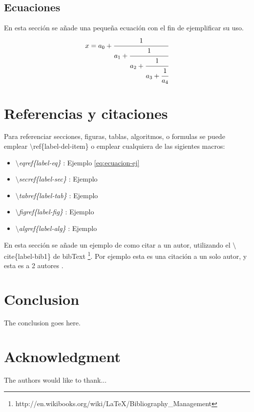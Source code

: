 \subsection{Ecuaciones}
En esta sección se añade una pequeña ecuación con el fin de ejemplificar su
uso.
\begin{equation}\label{eq:ecuacion-ej}
  x = a_0 + \cfrac{1}{a_1
          + \cfrac{1}{a_2
          + \cfrac{1}{a_3 + \cfrac{1}{a_4} } } }
\end{equation}

\section{Referencias y citaciones}
Para referenciar secciones, figuras, tablas, algoritmos, o formulas se puede
emplear $\setminus$ref\{label-del-item\} o emplear cualquiera de las sigientes macros:

\begin{itemize}
\item \textit{$\setminus$eqref\{label-eq\}} : Ejemplo \eqref{eq:ecuacion-ej}
\item \textit{$\setminus$secref\{label-sec\}} : Ejemplo 
\item \textit{$\setminus$tabref\{label-tab\}} : Ejemplo 
\item \textit{$\setminus$figref\{label-fig\}} : Ejemplo 
\item \textit{$\setminus$algref\{label-alg\}} : Ejemplo 
\end{itemize}

En esta sección se añade un ejemplo de como citar a un autor, utilizando
el $\setminus$cite\{label-bib1\} de bibText \footnote{http://en.wikibooks.org/wiki/LaTeX/Bibliography\_Management}.
Por ejemplo esta es una citación \cite{griffiths1997learning} a un solo
autor, y esta es a 2 autores \cite{griffiths1997learning, lamport1985i1}.


\section{Conclusion}
The conclusion goes here.

\section*{Acknowledgment}
The authors would like to thank...

